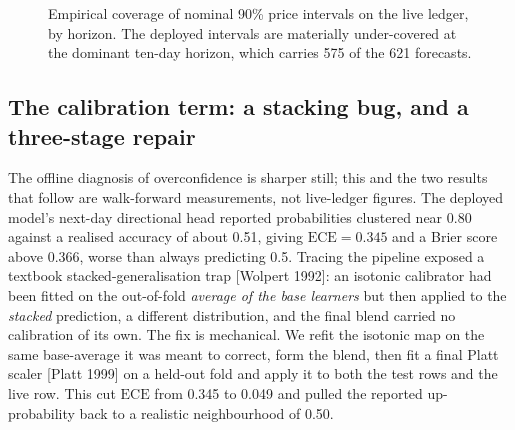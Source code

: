 \documentclass[10pt,a4paper,oneside]{article}
\theoremstyle{definition}
\theoremstyle{plain}
\newcommand{\ece}{\mathrm{ECE}}
\begin{document}
\begin{figure}[t]
\centering
{}
\caption{Empirical coverage of nominal 90\% price intervals on the live ledger, by
horizon. The deployed intervals are materially under-covered at the dominant ten-day
horizon, which carries 575 of the 621 forecasts.}
\label{fig:cov}
\end{figure}

\subsection{The calibration term: a stacking bug, and a three-stage repair}
\label{sec:resultcal}
The offline diagnosis of overconfidence is sharper still; this and the two results
that follow are walk-forward measurements, not live-ledger figures. The deployed
model's next-day directional head reported probabilities clustered near 0.80 against a
realised accuracy of about 0.51, giving $\ece=0.345$ and a Brier score above 0.366,
worse than always predicting 0.5. Tracing the pipeline exposed a textbook
stacked-generalisation trap [Wolpert 1992]: an isotonic calibrator had been fitted on
the out-of-fold \emph{average of the base learners} but then applied to the
\emph{stacked} prediction, a different distribution, and the final blend carried no
calibration of its own. The fix is mechanical. We refit the isotonic map on the same
base-average it was meant to correct, form the blend, then fit a final Platt scaler
[Platt 1999] on a held-out fold and apply it to both the test rows and the live row.
This cut $\ece$ from 0.345 to 0.049 and pulled the reported up-probability back to a
realistic neighbourhood of 0.50.
\end{document}
